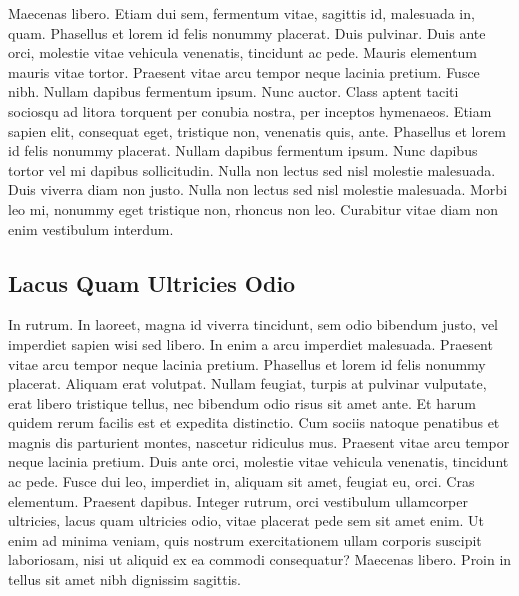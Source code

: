 \documentclass[english,master,dept460,male,cpp,cpdeclaration]{diploma}
\begin{document}
Maecenas libero. Etiam dui sem, fermentum vitae, sagittis id, malesuada in, quam. Phasellus et lorem id felis nonummy placerat. Duis pulvinar. Duis ante orci, molestie vitae vehicula venenatis, tincidunt ac pede. Mauris elementum mauris vitae tortor. Praesent vitae arcu tempor neque lacinia pretium. Fusce nibh. Nullam dapibus fermentum ipsum. Nunc auctor. Class aptent taciti sociosqu ad litora torquent per conubia nostra, per inceptos hymenaeos. Etiam sapien elit, consequat eget, tristique non, venenatis quis, ante. Phasellus et lorem id felis nonummy placerat. Nullam dapibus fermentum ipsum. Nunc dapibus tortor vel mi dapibus sollicitudin. Nulla non lectus sed nisl molestie malesuada. Duis viverra diam non justo. Nulla non lectus sed nisl molestie malesuada. Morbi leo mi, nonummy eget tristique non, rhoncus non leo. Curabitur vitae diam non enim vestibulum interdum.

\subsection{Lacus Quam Ultricies Odio}
In rutrum. In laoreet, magna id viverra tincidunt, sem odio bibendum justo, vel imperdiet sapien wisi sed libero. In enim a arcu imperdiet malesuada. Praesent vitae arcu tempor neque lacinia pretium. Phasellus et lorem id felis nonummy placerat. Aliquam erat volutpat. Nullam feugiat, turpis at pulvinar vulputate, erat libero tristique tellus, nec bibendum odio risus sit amet ante. Et harum quidem rerum facilis est et expedita distinctio. Cum sociis natoque penatibus et magnis dis parturient montes, nascetur ridiculus mus. Praesent vitae arcu tempor neque lacinia pretium. Duis ante orci, molestie vitae vehicula venenatis, tincidunt ac pede. Fusce dui leo, imperdiet in, aliquam sit amet, feugiat eu, orci. Cras elementum. Praesent dapibus. Integer rutrum, orci vestibulum ullamcorper ultricies, lacus quam ultricies odio, vitae placerat pede sem sit amet enim. Ut enim ad minima veniam, quis nostrum exercitationem ullam corporis suscipit laboriosam, nisi ut aliquid ex ea commodi consequatur? Maecenas libero. Proin in tellus sit amet nibh dignissim sagittis.
\end{document}
